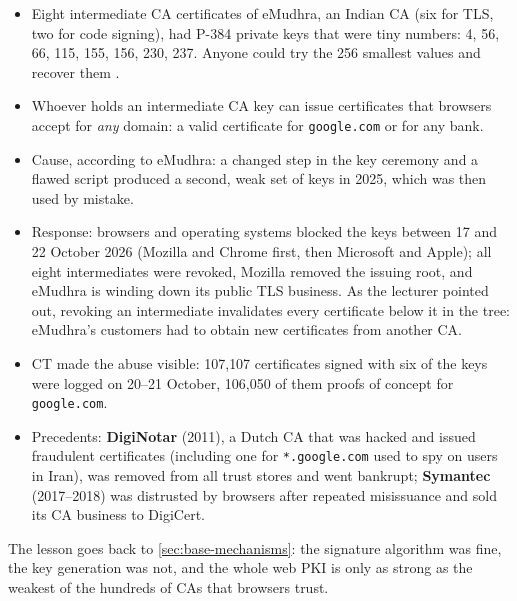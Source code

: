 \begin{itemize}
    \item Eight intermediate CA certificates of eMudhra, an Indian CA (six for TLS, two for code signing), had P-384 private keys that were tiny numbers: 4, 56, 66, 115, 155, 156, 230, 237. Anyone could try the 256 smallest values and recover them \cite{mozilla2026emudhra}.
    \item Whoever holds an intermediate CA key can issue certificates that browsers accept for \emph{any} domain: a valid certificate for \texttt{google.com} or for any bank.
    \item Cause, according to eMudhra: a changed step in the key ceremony and a flawed script produced a second, weak set of keys in 2025, which was then used by mistake.
    \item Response: browsers and operating systems blocked the keys between 17 and 22 October 2026 (Mozilla and Chrome first, then Microsoft and Apple); all eight intermediates were revoked, Mozilla removed the issuing root, and eMudhra is winding down its public TLS business. As the lecturer pointed out, revoking an intermediate invalidates every certificate below it in the tree: eMudhra's customers had to obtain new certificates from another CA.
    \item CT made the abuse visible: 107{,}107 certificates signed with six of the keys were logged on 20--21 October, 106{,}050 of them proofs of concept for \texttt{google.com}.
    \item Precedents: \textbf{DigiNotar} (2011), a Dutch CA that was hacked and issued fraudulent certificates (including one for \texttt{*.google.com} used to spy on users in Iran), was removed from all trust stores and went bankrupt; \textbf{Symantec} (2017--2018) was distrusted by browsers after repeated misissuance and sold its CA business to DigiCert.
\end{itemize}
The lesson goes back to \cref{sec:base-mechanisms}: the signature algorithm was fine, the key generation was not, and the whole web PKI is only as strong as the weakest of the hundreds of CAs that browsers trust.


